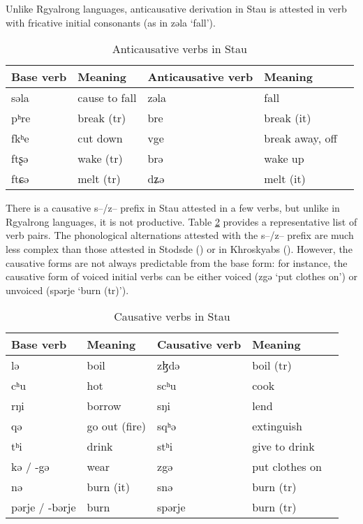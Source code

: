 \documentclass[oneside,a4paper,11pt]{article}
\newcommand{\ipa}[1]{{\phon #1}} %
\begin{document}
Unlike Rgyalrong languages, anticausative derivation in Stau is attested in verb with fricative initial consonants (as in \ipa{zəla}  `fall').
 
  \begin{table}[H]
 \caption{Anticausative verbs in Stau} \label{tab:anticausative} \centering 
\begin{tabular}{lllll}
\toprule
Base verb & Meaning & Anticausative verb & Meaning \\
\midrule
 \ipa{səla} &cause to fall & \ipa{zəla}  & fall \\
\ipa{pʰre}   &break (tr) &\ipa{bre}   & break (it) \\
  \ipa{fkʰe} & cut down & \ipa{vge} & break away, off \\
\ipa{ftʂə}& wake (tr) & \ipa{brə}& wake up\\
\ipa{ftɕə} &melt (tr) &\ipa{dʑə} &melt (it)\\
 \bottomrule
\end{tabular}
\end{table}
 
There is a causative \ipa{s--/z--} prefix in Stau attested in a few verbs, but unlike in Rgyalrong languages, it is not productive. Table \ref{tab:causative} provides a representative list of verb pairs. The phonological alternations attested with the \ipa{s--/z--} prefix are much less complex than those attested in Stodsde (\citealt{jackson07shangzhai}) or in Khroskyabs (\citealt{lai14caus}). However, the causative forms are not always predictable from the base form: for instance, the causative form of voiced initial verbs can be either voiced (\ipa{zgə} `put clothes on') or unvoiced (\ipa{spərje} `burn (tr)').
 
 
   \begin{table}[H]
 \caption{Causative verbs in Stau} \label{tab:causative} \centering 
\begin{tabular}{lllll}
\toprule
Base verb & Meaning & Causative verb & Meaning \\
\midrule
 \ipa{lə}  &boil& \ipa{zɮdə}& boil (tr)\\
  \ipa{cʰu}  & hot &  \ipa{scʰu}& cook \\
    \ipa{rŋi}  & borrow &  \ipa{sŋi}& lend \\
    \ipa{qə}  & go out (fire) &  \ipa{sqʰə}& extinguish\\
    \ipa{tʰi}  & drink &  \ipa{stʰi} & give to drink\\
    \ipa{kə} / \ipa{-gə} & wear &  \ipa{zgə} & put clothes on \\
     \ipa{nə}  & burn (it) &  \ipa{snə}& burn (tr)\\
     \ipa{pərje} / \ipa{-bərje} & burn &  \ipa{spərje} & burn (tr)\\
 \bottomrule
\end{tabular}
\end{table}
\end{document}
